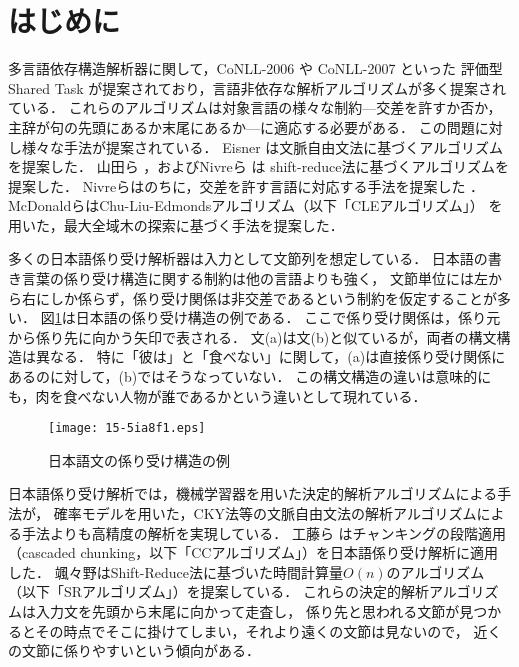 \documentclass[japanese]{jnlp_1.4}
\begin{document}
\maketitle


\section{はじめに}

多言語依存構造解析器に関して，CoNLL-2006  や CoNLL-2007  といった
評価型 Shared Task が提案されており，言語非依存な解析アルゴリズムが多く提案されている．
これらのアルゴリズムは対象言語の様々な制約---交差を許すか否か，
主辞が句の先頭にあるか末尾にあるか---に適応する必要がある．
この問題に対し様々な手法が提案されている．
Eisner  は文脈自由文法に基づくアルゴリズムを提案した．
山田ら ，およびNivreら  は
shift-reduce法に基づくアルゴリズムを提案した．
Nivreらはのちに，交差を許す言語に対応する手法を提案した  ．
McDonaldらはChu-Liu-Edmondsアルゴリズム（以下「CLEアルゴリズム」）
を用いた，最大全域木の探索に基づく手法を提案した．

多くの日本語係り受け解析器は入力として文節列を想定している．
日本語の書き言葉の係り受け構造に関する制約は他の言語よりも強く，
文節単位には左から右にしか係らず，係り受け関係は非交差であるという制約を仮定することが多い．
図\ref{fig_jpsen}は日本語の係り受け構造の例である．
ここで係り受け関係は，係り元から係り先に向かう矢印で表される．
文(a)は文(b)と似ているが，両者の構文構造は異なる．
特に「彼は」と「食べない」に関して，(a)は直接係り受け関係にあるのに対して，(b)ではそうなっていない．
この構文構造の違いは意味的にも，肉を食べない人物が誰であるかという違いとして現れている．

\begin{figure}[b]
\begin{center}
\texttt{[image: 15-5ia8f1.eps]}
\end{center}
\caption{日本語文の係り受け構造の例}
\label{fig_jpsen}
\end{figure}



日本語係り受け解析では，機械学習器を用いた決定的解析アルゴリズムによる手法が，
確率モデルを用いた，CKY法等の文脈自由文法の解析アルゴリズムによる手法よりも高精度の解析を実現している．
工藤ら  はチャンキングの段階適用（cascaded chunking，以下「CCアルゴリズム」）を日本語係り受け解析に適用した．
颯々野はShift-Reduce法に基づいた時間計算量$O(n)$のアルゴリズム（以下「SRアルゴリズム」）を提案している．
これらの決定的解析アルゴリズムは入力文を先頭から末尾に向かって走査し，
係り先と思われる文節が見つかるとその時点でそこに掛けてしまい，それより遠くの文節は見ないので，
近くの文節に係りやすいという傾向がある．
\end{document}
